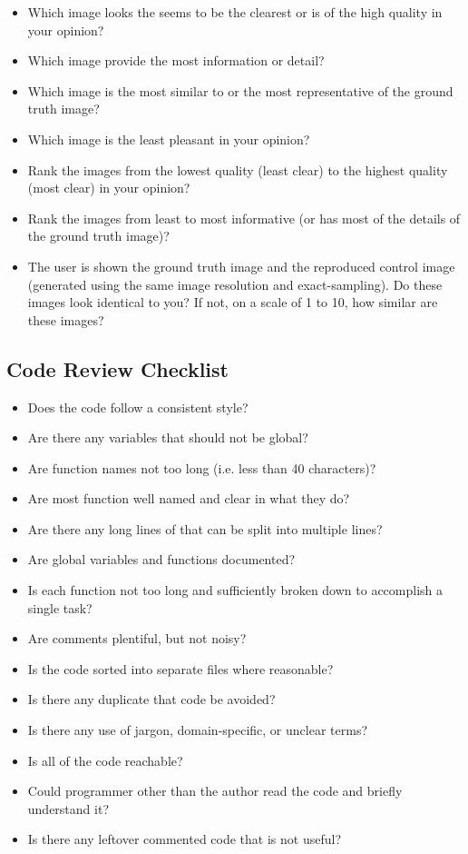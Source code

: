 \documentclass[12pt, titlepage]{article}
\begin{document}
\begin{itemize}
  \item{Which image looks the seems to be the clearest or is of the high quality in your opinion?}
  \item{Which image provide the most information or detail?}
  \item{Which image is the most similar to or the most representative of the ground truth image?}
  \item{Which image is the least pleasant in your opinion?}
  \item{Rank the images from the lowest quality (least clear) to the highest quality (most clear) in your opinion?}
  \item{Rank the images from least to most informative (or has most of the details of the ground truth image)?}
  \item{The user is shown the ground truth image and the reproduced control image 
  (generated using the same image resolution and exact-sampling). 
  Do these images look identical to you? If not, on a scale of 1 to 10, how similar are these images?}
\end{itemize}

\subsection{Code Review Checklist} \label{checklist_codeReview}

\begin{itemize}
  \item{Does the code follow a consistent style?}
  \item{Are there any variables that should not be global?}
  \item{Are function names not too long (i.e. less than 40 characters)?}
  \item{Are most function well named and clear in what they do?}
  \item{Are there any long lines of that can be split into multiple lines?}
  \item{Are global variables and functions documented?}
  \item{Is each function not too long and sufficiently broken down to accomplish a single task?}
  \item{Are comments plentiful, but not noisy?}
  \item{Is the code sorted into separate files where reasonable?}
  \item{Is there any duplicate that code be avoided?}
  \item{Is there any use of jargon, domain-specific, or unclear terms?}
  \item{Is all of the code reachable?}
  \item{Could programmer other than the author read the code and briefly understand it?}
  \item{Is there any leftover commented code that is not useful?}
\end{itemize}
\end{document}
